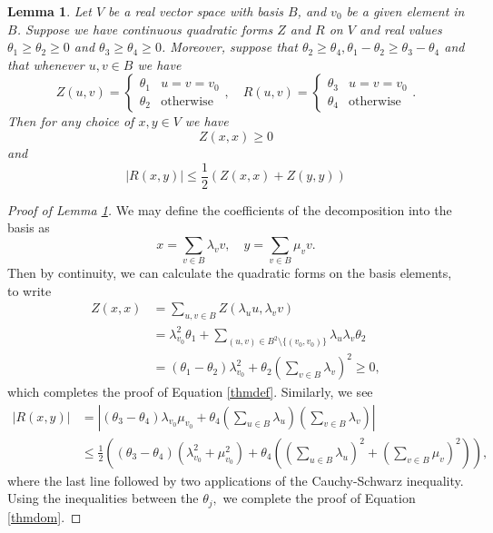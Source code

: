 \documentclass[12pt]{amsart}
\numberwithin{equation}{section}
\newtheorem{lem}[thm]{Lemma}
\numberwithin{thm}{section}
\newcommand{\1}{\mathbf 1}
\begin{document}
\begin{lem}\label{sufconthm}
Let $V$ be a real vector space with basis $B$, and $v_0$ be a given element in $B$. Suppose we have continuous quadratic forms $Z$ and $R$ on $V$ and real values $\theta_1\ge \theta_2\ge 0$ and $\theta_3\ge \theta_4\ge 0$. Moreover, suppose that $\theta_2\ge \theta_4, \theta_1-\theta_2\ge \theta_3-\theta_4$ and that whenever $u,v\in B$ we have
\begin{equation}
		Z(u,v)=\begin{cases}
			\theta_1& u=v=v_0\\
			\theta_2& \text{otherwise}
		\end{cases}, \quad 
	R(u,v)=\begin{cases}
		\theta_3& u=v=v_0\\
		\theta_4& \text{otherwise}
	\end{cases}.\end{equation}
	Then for any choice of $x,y\in V$ we have \begin{equation}\label{thmdef}
		Z(x,x)\ge 0
	\end{equation}
	and \begin{equation}\label{thmdom}
		|R(x,y)|\le \frac{1}{2}\left(Z(x,x)+Z(y,y)\right)
	\end{equation}
\end{lem} 
\begin{proof}[Proof of Lemma \ref{sufconthm}]
	We may define the coefficients of the decomposition into the basis as \begin{equation}x=\sum_{v\in B}\lambda_v v,\quad y=\sum_{v\in B}\mu_v v.\end{equation}
	Then by continuity, we can calculate the quadratic forms on the basis elements, to write
	\begin{align}
	Z(x,x)&=\sum_{u,v\in B} Z(\lambda_u u,\lambda_v v)\\
	&= \lambda_{v_0}^2 \theta_1+\sum_{(u,v)\in B^2\setminus\{(v_0,v_0)\}}\lambda_u \lambda_v \theta_2\\
		&= (\theta_1-\theta_2)\lambda_{v_0}^2 +\theta_2 \left(\sum_{v\in B} \lambda_v\right)^2\ge 0,
	\end{align}
	which completes the proof of Equation \eqref{thmdef}.
	Similarly, we see \begin{align}
		|R(x,y)|&=\left|(\theta_3-\theta_4) \lambda_{v_0}\mu_{v_0}+\theta_4\left(\sum_{u\in B} \lambda_u\right)\left(\sum_{v\in B} \lambda_v \right)\right|\\&\le
		\frac{1}{2}\left((\theta_3-\theta_4)\left(\lambda_{v_0}^2+\mu_{v_0}^2\right)+\theta_4\left(\left(\sum_{u\in B} \lambda_u\right)^2+\left(\sum_{v\in B} \mu_v\right)^2\right)\right), 
 	\end{align}
	where the last line followed by two applications of the Cauchy-Schwarz inequality.
	Using the inequalities between the $\theta_j,$ we complete the proof of Equation \eqref{thmdom}.
\end{proof}




\end{document}
